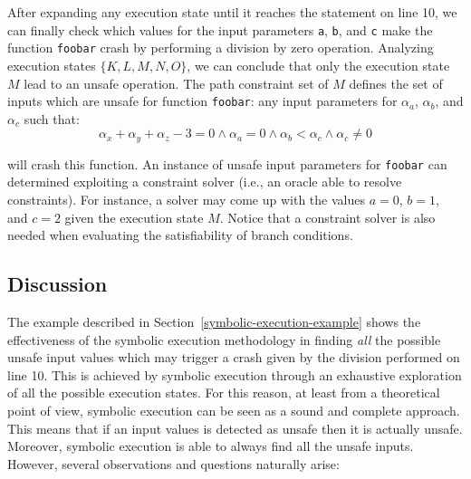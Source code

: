 \documentclass[10pt, a4paper]{article}
\begin{document}
After expanding any execution state until it reaches the statement on line 10, we can finally check which values for the input parameters {\tt a}, {\tt b}, and {\tt c} make the function {\tt foobar} crash by performing a division by zero operation. Analyzing execution states $\{K, L, M, N, O\}$, we can conclude that only the execution state $M$ lead to an unsafe operation. The path constraint set of $M$ defines the set of inputs which are unsafe for function {\tt foobar}: any input parameters for $\alpha_a$, $\alpha_b$, and $\alpha_c$ such that:
 \[ \alpha_x + \alpha_y + \alpha_z - 3 = 0 \wedge \alpha_a = 0 \wedge \alpha_b < \alpha_c \wedge \alpha_c \neq 0 \]

will crash this function. An instance of unsafe input parameters for {\tt foobar} can determined exploiting a constraint solver (i.e., an oracle able to resolve constraints). For instance, a solver may come up with the values $a = 0$, $b = 1$, and $c = 2$ given the execution state $M$. Notice that a constraint solver is also needed when evaluating the satisfiability of branch conditions. 

\subsection{Discussion}
\label{example-discussion}

The example described in Section~\ref{symbolic-execution-example} shows the effectiveness of the symbolic execution methodology in finding {\em all} the possible unsafe input values which may trigger a crash given by the division performed on line 10. This is achieved by symbolic execution through an exhaustive exploration of all the possible execution states. For this reason, at least from a theoretical point of view, symbolic execution can be seen as a sound and complete approach. This means that if an input values is detected as unsafe then it is actually unsafe. Moreover, symbolic execution is able to always find all the unsafe inputs. However, several observations and questions naturally arise:
\end{document}
